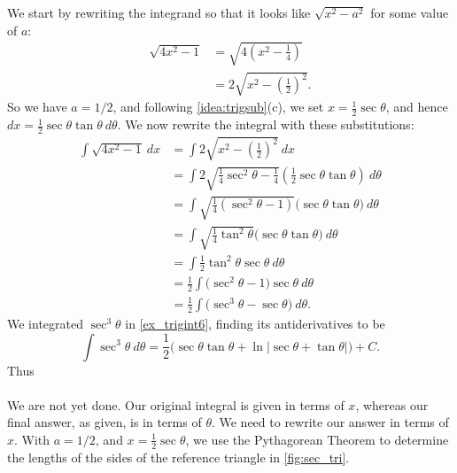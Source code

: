 {We start by rewriting the integrand so that it looks like $\sqrt{x^2-a^2}$ for some value of $a$:
\begin{align*}
\sqrt{4x^2-1} &= \sqrt{4\left(x^2-\frac14\right)}\\
		&= 2\sqrt{x^2-\left(\frac12\right)^2}.
\end{align*}
So we have $a=1/2$, and following \autoref{idea:trigsub}(c), we set $x= \frac12\sec\theta$, and hence $dx = \frac12\sec\theta\tan\theta\ d\theta$. %
We now rewrite the integral with these substitutions:
\begin{align*}
\int \sqrt{4x^2-1}\ dx &= \int 2\sqrt{x^2-\left(\frac12\right)^2}\ dx\\
			&= \int 2\sqrt{\frac14\sec^2\theta - \frac14}\left(\frac12\sec\theta\tan\theta\right)\ d\theta\\
			&=\int \sqrt{\frac14(\sec^2\theta-1)}\Big(\sec\theta\tan\theta\Big)\ d\theta\\
			&=\int\sqrt{\frac14\tan^2\theta}\Big(\sec\theta\tan\theta\Big)\ d\theta\\
			&=\int \frac12\tan^2\theta\sec\theta\ d\theta\\
			&=\frac12\int \Big(\sec^2\theta-1\Big)\sec\theta\ d\theta\\
			&=\frac12\int \big(\sec^3\theta - \sec\theta\big)\ d\theta.
\end{align*}
We integrated $\sec^3\theta$ in \autoref{ex_trigint6}, finding its antiderivatives to be
$$\int \sec^3\theta\ d\theta = \frac12\Big(\sec \theta\tan \theta + \ln|\sec \theta+\tan \theta|\Big)+C.$$
Thus\\
\\
We are not yet done. Our original integral is given in terms of $x$, whereas our final answer, as given, is in terms of $\theta$. We need to rewrite our answer in terms of $x$. With $a=1/2$, and $x=\frac12\sec\theta$, we use the Pythagorean Theorem to determine the lengths of the sides of the reference triangle in \autoref{fig:sec_tri}.
}

